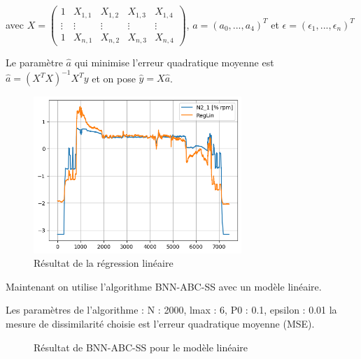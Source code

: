 \documentclass[french,12pt]{article}
\begin{document}
avec $X = \begin{pmatrix} 1      & X_{1, 1} & X_{1, 2} & X_{1, 3} & X_{1, 4} \\
                \vdots & \vdots   & \vdots   & \vdots   & \vdots   \\
                1      & X_{n, 1} & X_{n, 2} & X_{n, 3} & X_{n, 4}
    \end{pmatrix} $, $a = (a_0,..., a_4)^T$ et $\epsilon = (\epsilon_1,..., \epsilon_n)^T$

Le paramètre $\hat{a}$ qui minimise l'erreur quadratique moyenne est $\hat{a} = (X^T X)^{-1} X^T y$
et on pose $\hat{y} = X \hat{a}$.

\begin{figure}[H]
    \centering
    \includegraphics*[width = 0.7\textwidth]{../plots/RegLin.png}
    \caption{Résultat de la régression linéaire}
\end{figure}

Maintenant on utilise l'algorithme BNN-ABC-SS avec un modèle linéaire.

Les paramètres de l'algorithme :
N : 2000,
lmax : 6,
P0 : 0.1,
epsilon : 0.01
la mesure de dissimilarité choisie est l'erreur quadratique moyenne (MSE).

\begin{figure}[H]
    \centering
    \caption{Résultat de BNN-ABC-SS pour le modèle linéaire}
\end{figure}
\end{document}
